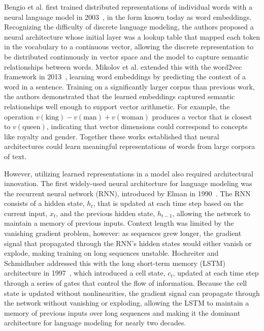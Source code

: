 Bengio et al. first trained distributed representations of individual words with a neural language model in 2003~\cite{bengio2003neural}, in the form known today as word embeddings. Recognizing the difficulty of discrete language modeling, the authors proposed a neural architecture whose initial layer was a lookup table that mapped each token in the vocabulary to a continuous vector, allowing the discrete representation to be distributed continuously in vector space and the model to capture semantic relationships between words. Mikolov et al. extended this with the word2vec framework in 2013~\cite{mikolov2013efficient}, learning word embeddings by predicting the context of a word in a sentence. Training on a significantly larger corpus than previous work, the authors demonstrated that the learned embeddings captured semantic relationships well enough to support vector arithmetic. For example, the operation $v(\text{king}) - v(\text{man}) + v(\text{woman})$ produces a vector that is closest to $v(\text{queen})$, indicating that vector dimensions could correspond to concepts like royalty and gender. Together these works established that neural architectures could learn meaningful representations of words from large corpora of text.

However, utilizing learned representations in a model also required architectural innovation. The first widely-used neural architecture for language modeling was the recurrent neural network (RNN), introduced by Elman in 1990~\cite{elman1990finding}. The RNN consists of a hidden state, $h_t$, that is updated at each time step based on the current input, $x_t$, and the previous hidden state, $h_{t-1}$, allowing the network to maintain a memory of previous inputs. Context length was limited by the vanishing gradient problem, however: as sequences grew longer, the gradient signal that propagated through the RNN's hidden states would either vanish or explode, making training on long sequences unstable. Hochreiter and Schmidhuber addressed this with the long short-term memory (LSTM) architecture in 1997~\cite{hochreiter1997long}, which introduced a cell state, $c_t$, updated at each time step through a series of gates that control the flow of information. Because the cell state is updated without nonlinearities, the gradient signal can propagate through the network without vanishing or exploding, allowing the LSTM to maintain a memory of previous inputs over long sequences and making it the dominant architecture for language modeling for nearly two decades.

